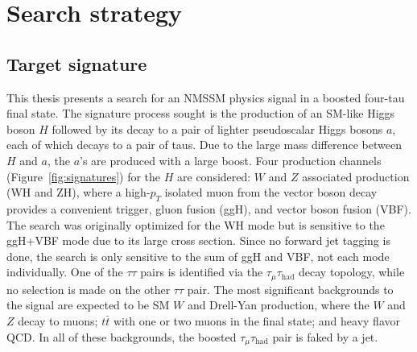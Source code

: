 \chapter{Search strategy\label{sec:strategy}}

\section{Target signature\label{sec:signature}}
This thesis presents a search for an NMSSM physics signal in a boosted four-tau final state. The signature process sought is the production of an SM-like Higgs boson $H$ followed by its decay to a pair of lighter pseudoscalar Higgs bosons $a$, each of which decays to a pair of taus. Due to the large mass difference between $H$ and $a$, the $a$'s are produced with a large boost. Four production channels (Figure~\ref{fig:signatures}) for the $H$ are considered: $W$ and $Z$ associated production (WH and ZH), where a high-$p_T$ isolated muon from the vector boson decay provides a convenient trigger, gluon fusion (ggH), and vector boson fusion (VBF). The search was originally optimized for the WH mode but is sensitive to the ggH+VBF mode due to its large cross section. Since no forward jet tagging is done, the search is only sensitive to the sum of ggH and VBF, not each mode individually.  One of the $\tau\tau$ pairs is identified via the $\tau_{\mu}\tau_{\text{had}}$ decay topology, while no selection is made on the other $\tau\tau$ pair. The most significant backgrounds to the signal are expected to be SM $W$ and Drell-Yan production, where the $W$ and $Z$ decay to muons; $t\bar{t}$ with one or two muons in the final state; and heavy flavor QCD. In all of these backgrounds, the boosted $\tau_{\mu}\tau_{\text{had}}$ pair is faked by a jet.


